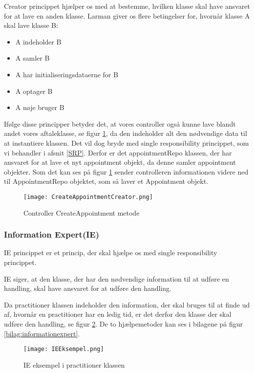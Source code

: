 Creator princippet hjælper os med at bestemme, hvilken klasse skal have ansvaret for at lave en anden klasse.
Larman giver os flere betingelser for, hvornår klasse A skal lave klasse B:

\begin{itemize}
    \item A indeholder B
    \item A samler B
    \item A har initialiseringsdataerne for B
    \item A optager B
    \item A nøje bruger B
\end{itemize}

Ifølge disse principper betyder det, at vores controller også kunne lave blandt andet vores aftaleklasse, se figur \ref{fig:controllerCreator}, da den indeholder alt den nødvendige data til at instantiere klassen.
Det vil dog bryde med single responsibility princippet, som vi behandler i afsnit \ref{SRP}.
Derfor er det appointmentRepo klassen, der har ansvaret for at lave et nyt appointment objekt, da denne samler appointment objekter.
Som det kan ses på figur \ref{fig:controllerCreator} sender controlleren informationen videre ned til AppointmentRepo objektet, som så laver et Appointment objekt.

\begin{figure}[h]
    \caption{Controller CreateAppointment metode}
    \centering
        \texttt{[image: CreateAppointmentCreator.png]}
    \label{fig:controllerCreator}
\end{figure}

\subsubsection{Information Expert(IE)}
IE princippet er et princip, der skal hjælpe os med single responsibility princippet.

IE siger, at den klasse, der har den nødvendige information til at udføre en handling, skal have ansvaret for at udføre den handling.

Da practitioner klassen indeholder den information, der skal bruges til at finde ud af, hvornår en practitioner har en ledig tid, er det derfor den klasse der skal udføre den handling, se figur \ref{fig:informationexpert}.
De to hjælpemetoder kan ses i bilagene på figur \ref{bilag:informationexpert}.

\begin{figure}[h]
    \caption{IE eksempel i practitioner klassen}
    \centering
        \texttt{[image: IEEksempel.png]}
    \label{fig:informationexpert}
\end{figure}


